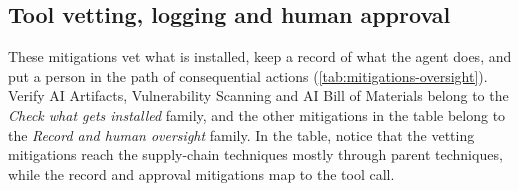 \subsection{Tool vetting, logging and human approval}
\label{sec:mitigations-oversight}

These mitigations vet what is installed, keep a record of what the agent does, and put a person in
the path of consequential actions (\cref{tab:mitigations-oversight}). Verify AI Artifacts,
Vulnerability Scanning and AI Bill of Materials belong to the \emph{Check what gets installed}
family, and the other mitigations in the table belong to the \emph{Record and human oversight}
family. In the table, notice that the vetting mitigations reach the supply-chain techniques mostly
through parent techniques, while the record and approval mitigations map to the tool call.


